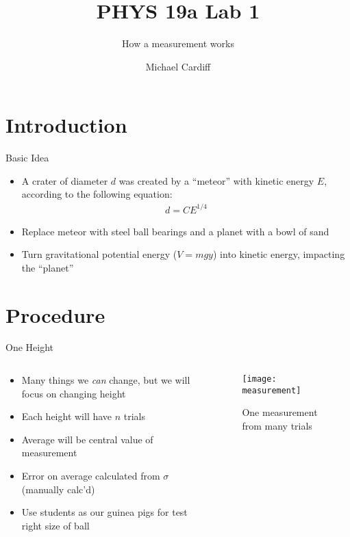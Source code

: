 \documentclass{beamer}
\title{PHYS 19a Lab 1}
\author{Michael Cardiff}
\subtitle{How a measurement works}
\begin{document}
\begin{frame}
  \titlepage
\end{frame}

\section{Introduction}
\begin{frame}{Basic Idea}
  \begin{itemize}
  \item A crater of diameter $d$ was created by a ``meteor'' with kinetic energy $E$, according to the following equation:
    \begin{align*}
      d=CE^{1/4}
    \end{align*}
  \item Replace meteor with steel ball bearings and a planet with a bowl of sand 
  \item Turn gravitational potential energy ($V=mgy$) into kinetic energy, impacting the ``planet''
  \end{itemize}
\end{frame}

\section{Procedure}
\begin{frame}{One Height}
  \begin{columns}
    \begin{column}{0.5\textwidth}
      \begin{itemize}
      \item Many things we \emph{can} change, but we will focus on changing height
      \item Each height will have $n$ trials
      \item Average will be central value of measurement
      \item Error on average calculated from $\sigma$ (manually calc'd)
      \item Use students as our guinea pigs for test right size of ball
      \end{itemize}
    \end{column}
    \begin{column}{0.5\textwidth}
      \begin{figure}[H]
        \centering
        \texttt{[image: measurement]}
        \caption{One measurement from many trials}
        \label{fig:1}
      \end{figure}
    \end{column}
  \end{columns}
\end{frame}
\end{document}
